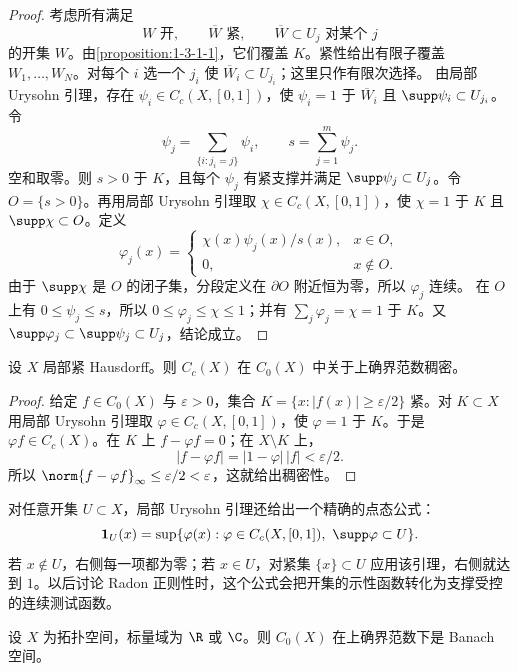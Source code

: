 \begin{proof}
考虑所有满足
\[
 W\text{ 开},\qquad \overline W\text{ 紧},\qquad
 \overline W\subset U_j\text{ 对某个 }j
\]
的开集 $W$。由\cref{proposition:1-3-1-1}，它们覆盖 $K$。紧性给出有限子覆盖
$W_1,\ldots,W_N$。对每个 $i$ 选一个 $j_i$ 使 $\overline W_i\subset U_{j_i}$；这里只作有限次选择。
由局部 Urysohn 引理，存在 $\psi_i\in C_c(X,[0,1])$，使
$\psi_i=1$ 于 $\overline W_i$ 且 $\supp\psi_i\subset U_{j_i}$。令
\[
  \psi_j=\sum_{\{i:j_i=j\}}\psi_i,
  \qquad s=\sum_{j=1}^m\psi_j.
\]
空和取零。则 $s>0$ 于 $K$，且每个 $\psi_j$ 有紧支撑并满足
$\supp\psi_j\subset U_j$。令 $O=\{s>0\}$。再用局部 Urysohn 引理取
$\chi\in C_c(X,[0,1])$，使 $\chi=1$ 于 $K$ 且 $\supp\chi\subset O$。定义
\[
 \varphi_j(x)=
 \begin{cases}
   \chi(x)\psi_j(x)/s(x),&x\in O,\\
   0,&x\notin O.
 \end{cases}
\]
由于 $\supp\chi$ 是 $O$ 的闭子集，分段定义在 $\partial O$ 附近恒为零，所以 $\varphi_j$ 连续。
在 $O$ 上有 $0\le\psi_j\le s$，所以 $0\le\varphi_j\le\chi\le1$；并有
$\sum_j\varphi_j=\chi=1$ 于 $K$。又
$\supp\varphi_j\subset\supp\psi_j\subset U_j$，结论成立。
\end{proof}

\begin{proposition}[$C_c$ 在 $C_0$ 中稠密]\label{proposition:1-3-1-4}
设 $X$ 局部紧 Hausdorff。则 $C_c(X)$ 在 $C_0(X)$ 中关于上确界范数稠密。
\end{proposition}

\begin{proof}
给定 $f\in C_0(X)$ 与 $\varepsilon>0$，集合
$K=\{x:|f(x)|\ge\varepsilon/2\}$ 紧。对 $K\subset X$ 用局部 Urysohn 引理取
$\varphi\in C_c(X,[0,1])$，使 $\varphi=1$ 于 $K$。于是 $\varphi f\in C_c(X)$。在 $K$ 上
$f-\varphi f=0$；在 $X\setminus K$ 上，
\[
 |f-\varphi f|=|1-\varphi|\,|f|<\varepsilon/2.
\]
所以 $\norm{f-\varphi f}_\infty\le\varepsilon/2<\varepsilon$，这就给出稠密性。
\end{proof}

对任意开集 $U\subset X$，局部 Urysohn 引理还给出一个精确的点态公式：
\[
 \mathbf1_U(x)=
 \sup\{\varphi(x):\varphi\in C_c(X,[0,1]),\ \supp\varphi\subset U\}.
\]
若 $x\notin U$，右侧每一项都为零；若 $x\in U$，对紧集 $\{x\}\subset U$ 应用该引理，右侧就达到
$1$。以后讨论 Radon 正则性时，这个公式会把开集的示性函数转化为支撑受控的连续测试函数。

\begin{proposition}[$C_0(X)$ 的完备性]\label{proposition:1-3-1-c0-complete}
设 $X$ 为拓扑空间，标量域为 $\R$ 或 $\C$。则 $C_0(X)$ 在上确界范数下是 Banach 空间。
\end{proposition}

